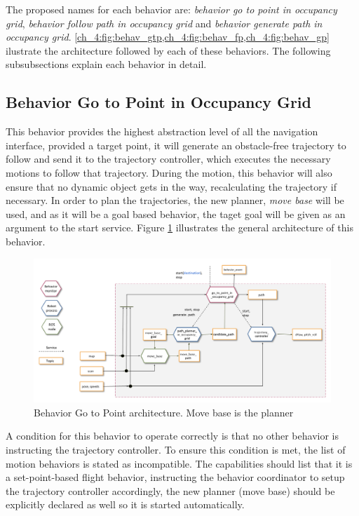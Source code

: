   The proposed names for each behavior are: \textit{behavior go to point in occupancy grid}, \textit{behavior follow path in occupancy grid} and \textit{behavior generate path in occupancy grid}. \cref{ch_4:fig:behav_gtp,ch_4:fig:behav_fp,ch_4:fig:behav_gp} ilustrate the architecture followed by each of these behaviors. The following subsubsections explain each behavior in detail.

\subsection{Behavior Go to Point in Occupancy Grid} \label{ch_4:subsect:behav_gtp}

  This behavior provides the highest abstraction level of all the navigation interface, provided a target point, it will generate an obstacle-free trajectory to follow and send it to the trajectory controller, which executes the necessary motions to follow that trajectory. During the motion, this behavior will also ensure that no dynamic object gets in the way, recalculating the trajectory if necessary. In order to plan the trajectories, the new planner, \textit{move base} will be used, and as it will be a goal based behavior, the taget goal will be given as an argument to the start service. Figure \ref{ch_4:fig:behav_gtp} illustrates the general architecture of this behavior.

  \begin{figure}[h]
    \centering
    \includegraphics[width=\textwidth]{./Figures/BehaviorGTPArquitecture.png}
    \caption{Behavior Go to Point architecture. Move base is the planner}
    \label{ch_4:fig:behav_gtp}
  \end{figure}

  A condition for this behavior to operate correctly is that no other behavior is instructing the trajectory controller. To ensure this condition is met, the list of motion behaviors is stated as incompatible. The capabilities should list that it is a set-point-based flight behavior, instructing the behavior coordinator to setup the trajectory controller accordingly, the new planner (move base) should be explicitly declared as well so it is started automatically.

